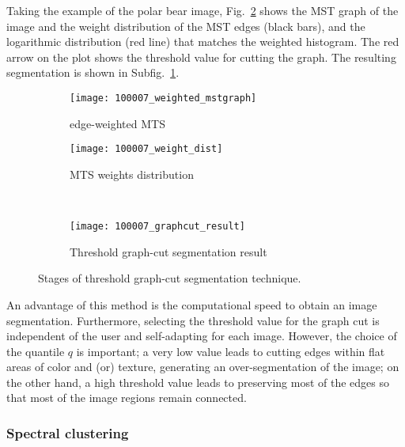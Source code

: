Taking the example of the polar bear image, Fig.\ \ref{fig:graphcut_segmentation_technique}  shows the MST graph of the image and the weight distribution of the MST edges (black bars), and the logarithmic distribution (red line) that matches the weighted histogram. The red arrow on the plot shows the threshold value for cutting the graph. The resulting segmentation is shown in Subfig.\ \ref{fig:graphcut_segmentation_result}.

\begin{figure}[!ht]
    \centering
    \begin{subfigure}[b]{0.49\textwidth}
    	\texttt{[image: 100007\_weighted\_mstgraph]}
    	\caption{edge-weighted MTS} 
    \end{subfigure}      
    \begin{subfigure}[b]{0.49\textwidth}
        \texttt{[image: 100007\_weight\_dist]}
        \caption{MTS weights distribution}
    \end{subfigure}\\ [1ex]
    \begin{subfigure}[b]{0.49\textwidth}
        \texttt{[image: 100007\_graphcut\_result]}
        \caption{Threshold graph-cut segmentation result}
        \label{fig:graphcut_segmentation_result}
    \end{subfigure}    
    
	\caption{Stages of threshold graph-cut segmentation technique.}\label{fig:graphcut_segmentation_technique}    
\end{figure}

An advantage of this method is the computational speed to obtain an image segmentation. Furthermore, selecting the threshold value for the graph cut is independent of the user and self-adapting for each image. However, the choice of the quantile $q$ is important; a very low value leads to cutting edges within flat areas of color and (or) texture, generating an over-segmentation of the image; on the other hand, a high threshold value leads to preserving most of the edges so that most of the image regions remain connected.

\subsubsection{Spectral clustering}

